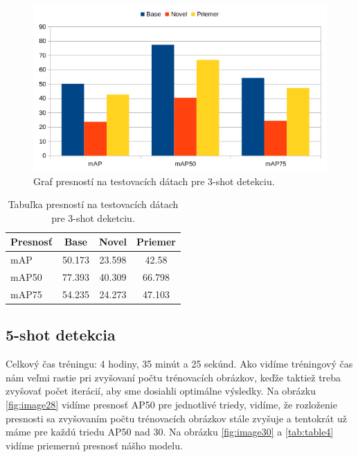 \begin{figure}[H]
\includegraphics[width=\textwidth]{images/3_shot_meanAP.png}
\centering
\caption{Graf presností na testovacích dátach pre 3-shot detekciu.}
\label{fig:image27}
\end{figure}

\begin{table}[H]
\begin{tabular}{|l|c|c|c|}
\hline
\textbf{Presnosť} & \textbf{Base} & \textbf{Novel} & \textbf{Priemer} \\
\hline
mAP & 50.173 & 23.598 & 42.58 \\
mAP50 & 77.393 & 40.309 & 66.798 \\
mAP75 & 54.235 & 24.273 & 47.103 \\
\hline
\end{tabular}
\centering
\caption{Tabuľka presností na testovacích dátach pre 3-shot deketciu.}
\label{tab:table3}
\end{table}

\subsection{5-shot detekcia}

Celkový čas tréningu: 4 hodiny, 35 minút a 25 sekúnd. Ako vidíme tréningový čas nám veľmi rastie pri zvyšovaní počtu trénovacích obrázkov, keďže taktiež treba zvyšovať počet iterácií, aby sme dosiahli optimálne výsledky. Na obrázku \ref{fig:image28} vidíme presnosť AP50 pre jednotlivé triedy, vidíme, že rozloženie presnosti sa zvyšovaním počtu trénovacích obrázkov stále zvyšuje a tentokrát už máme pre každú triedu AP50 nad 30. Na obrázku \ref{fig:image30} a \ref{tab:table4} vidíme priemernú presnosť nášho modelu.

